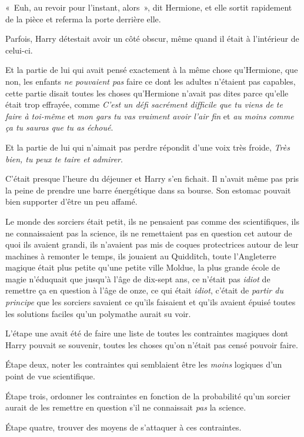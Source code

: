 «~Euh, au revoir pour l'instant, alors~», dit Hermione, et elle sortit rapidement de la pièce et referma la porte derrière elle.

Parfois, Harry détestait avoir un côté obscur, même quand il était à l'intérieur de celui-ci.

Et la partie de lui qui avait pensé exactement à la même chose qu'Hermione, que non, les enfants \emph{ne pouvaient pas} faire ce dont les adultes n'étaient pas capables, cette partie disait toutes les choses qu'Hermione n'avait pas dites parce qu'elle était trop effrayée, comme \emph{C'est un défi sacrément difficile que tu viens de te faire à toi-même} et \emph{mon gars tu vas vraiment avoir l'air fin} et \emph{au moins comme ça tu sauras que tu as échoué}.

Et la partie de lui qui n'aimait pas perdre répondit d'une voix très froide, \emph{Très bien, tu peux te taire et admirer}.

\later

C'était presque l'heure du déjeuner et Harry s'en fichait.
Il n'avait même pas pris la peine de prendre une barre énergétique dans sa bourse.
Son estomac pouvait bien supporter d'être un peu affamé.

Le monde des sorciers était petit, ils ne pensaient pas comme des scientifiques, ils ne connaissaient pas la science, ils ne remettaient pas en question cet autour de quoi ils avaient grandi, ils n'avaient pas mis de coques protectrices autour de leur machines à remonter le temps, ils jouaient au Quidditch, toute l'Angleterre magique était plus petite qu'une petite ville Moldue, la plus grande école de magie n'éduquait que jusqu'à l'âge de dix-sept ans, ce n'était pas \emph{idiot} de remettre ça en question à l'âge de onze, ce qui était \emph{idiot}, c'était de \emph{partir du principe} que les sorciers savaient ce qu'ils faisaient et qu'ils avaient épuisé toutes les solutions faciles qu'un polymathe aurait su voir.

L'étape une avait été de faire une liste de toutes les contraintes magiques dont Harry pouvait se souvenir, toutes les choses qu'on n'était pas censé pouvoir faire.

Étape deux, noter les contraintes qui semblaient être les \emph{moins} logiques d'un point de vue scientifique.

Étape trois, ordonner les contraintes en fonction de la probabilité qu'un sorcier aurait de les remettre en question s'il ne connaissait \emph{pas} la science.

Étape quatre, trouver des moyens de s'attaquer à ces contraintes.

